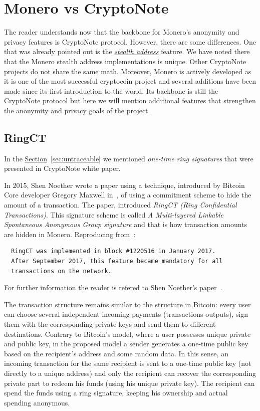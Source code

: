 \section{Monero vs CryptoNote}
The reader understands now that the backbone for Monero's anonymity and privacy features is CryptoNote protocol. However, there are some differences. One that was already pointed out is the \hyperref[sec:stealth]{\emph{stealth address}} feature. We have noted there that the Monero stealth address implementations is unique. Other CryptoNote projects do not share the same math. Moreover, Monero is actively developed as it is one of the most successful cryptocoin project and several additions have been made since its first introduction to the world. Its backbone is still the CryptoNote protocol but here we will mention additional features that strengthen the anonymity and privacy goals of the project.

\subsection{RingCT}
In the \hyperref[sec:untraceable]{Section}~\ref{sec:untraceable} we mentioned \emph{one-time ring signatures} that were presented in CryptoNote white paper.

In 2015, Shen Noether wrote a paper using a technique, introduced by Bitcoin Core developer Gregory Maxwell in~\cite{CT}, of using a commitment scheme to hide the amount of a transaction. The paper, introduced \emph{RingCT (Ring Confidential Transactions)}. This signature scheme is called \emph{A Multi-layered Linkable Spontaneous Anonymous Group signature} and that is how transaction amounts are hidden in Monero. Reproducing from~\cite{getmonero}:

\begin{verbatim}
  RingCT was implemented in block #1220516 in January 2017.
  After September 2017, this feature became mandatory for all
  transactions on the network.
\end{verbatim}
For further information the reader is refered to Shen Noether's paper~\cite{ringCT}.

The transaction structure remains similar to the structure in \hyperref[sec:Bitcoin]{Bitcoin}: every user can choose several independent incoming payments (transactions outputs), sign them with the corresponding private keys and send them to different destinations. Contrary to Bitcoin’s model, where a user possesses unique private and public key, in the proposed model a sender generates a one-time public key based on the recipient’s address and some random data. In this sense, an incoming transaction for the same recipient is sent to a one-time public key (not directly  to a unique  address) and only the recipient can recover the corresponding private part to redeem his funds (using his unique private key). The recipient can spend the funds using a ring signature, keeping his ownership and actual spending anonymous.

